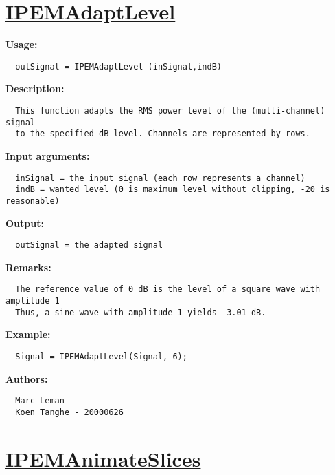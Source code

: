 \newpage
\section*{\hyperlink{Concepts:IPEMAdaptLevel}{IPEMAdaptLevel}}
\hypertarget{FuncRef:IPEMAdaptLevel}{}

\textbf{Usage:}
\begin{verbatim}  outSignal = IPEMAdaptLevel (inSignal,indB)

\end{verbatim}
\textbf{Description:}
\begin{verbatim}  This function adapts the RMS power level of the (multi-channel) signal
  to the specified dB level. Channels are represented by rows.

\end{verbatim}
\textbf{Input arguments:}
\begin{verbatim}  inSignal = the input signal (each row represents a channel)
  indB = wanted level (0 is maximum level without clipping, -20 is reasonable)

\end{verbatim}
\textbf{Output:}
\begin{verbatim}  outSignal = the adapted signal

\end{verbatim}
\textbf{Remarks:}
\begin{verbatim}  The reference value of 0 dB is the level of a square wave with amplitude 1
  Thus, a sine wave with amplitude 1 yields -3.01 dB.

\end{verbatim}
\textbf{Example:}
\begin{verbatim}  Signal = IPEMAdaptLevel(Signal,-6);

\end{verbatim}
\textbf{Authors:}
\begin{verbatim}  Marc Leman
  Koen Tanghe - 20000626
\end{verbatim}


\newpage
\section*{\hyperlink{Concepts:IPEMAnimateSlices}{IPEMAnimateSlices}}
\hypertarget{FuncRef:IPEMAnimateSlices}{}

